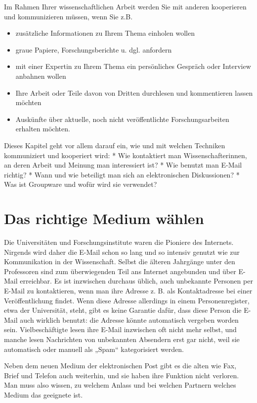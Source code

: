 \documentclass[]{book}
\providecommand{\tightlist}{%
  \setlength{\itemsep}{0pt}\setlength{\parskip}{0pt}}
\theoremstyle{definition}
\theoremstyle{definition}
\theoremstyle{definition}
\theoremstyle{remark}
\begin{document}
Im Rahmen Ihrer wissenschaftlichen Arbeit werden Sie mit anderen
kooperieren und kommunizieren müssen, wenn Sie z.B.

\begin{itemize}
\tightlist
\item
  zusätzliche Informationen zu Ihrem Thema einholen wollen
\item
  graue Papiere, Forschungsberichte u. dgl. anfordern
\item
  mit einer Expertin zu Ihrem Thema ein persönliches Gespräch oder
  Interview anbahnen wollen
\item
  Ihre Arbeit oder Teile davon von Dritten durchlesen und kommentieren
  lassen möchten
\item
  Auskünfte über aktuelle, noch nicht veröffentlichte Forschungsarbeiten
  erhalten möchten.
\end{itemize}

Dieses Kapitel geht vor allem darauf ein, wie und mit welchen Techniken
kommuniziert und kooperiert wird: * Wie kontaktiert man
Wissenschafterinnen, an deren Arbeit und Meinung man interessiert ist? *
Wie benutzt man E-Mail richtig? * Wann und wie beteiligt man sich an
elektronischen Diskussionen? * Was ist Groupware und wofür wird sie
verwendet?

\section{Das richtige Medium wählen}\label{das-richtige-medium-wahlen}

Die Universitäten und Forschungsinstitute waren die Pioniere des
Internets. Nirgends wird daher die E-Mail schon so lang und so intensiv
genutzt wie zur Kommunikation in der Wissenschaft. Selbst die älteren
Jahrgänge unter den Professoren sind zum überwiegenden Teil ans Internet
angebunden und über E-Mail erreichbar. Es ist inzwischen durchaus
üblich, auch unbekannte Personen per E-Mail zu kontaktieren, wenn man
ihre Adresse z. B. als Kontaktadresse bei einer Veröffentlichung findet.
Wenn diese Adresse allerdings in einem Personenregister, etwa der
Universität, steht, gibt es keine Garantie dafür, dass diese Person die
E-Mail auch wirklich benutzt: die Adresse könnte automatisch vergeben
worden sein. Vielbeschäftigte lesen ihre E-Mail inzwischen oft nicht
mehr selbst, und manche lesen Nachrichten von unbekannten Absendern erst
gar nicht, weil sie automatisch oder manuell als „Spam`` kategorisiert
werden.

Neben dem neuen Medium der elektronischen Post gibt es die alten wie
Fax, Brief und Telefon auch weiterhin, und sie haben ihre Funktion nicht
verloren. Man muss also wissen, zu welchem Anlass und bei welchen
Partnern welches Medium das geeignete ist.
\end{document}
